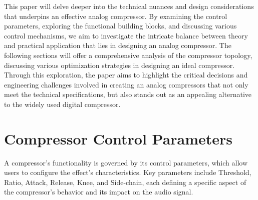 \documentclass[10pt]{article}
\begin{document}
\begin{multicols*}{2}
            This paper will delve deeper into the technical nuances and design considerations that underpins an effective analog compressor. By examining the control parameters, exploring the functional building blocks, and discussing various control mechanisms, we aim to investigate the intricate balance between theory and practical application that lies in designing an analog compressor. The following sections will offer a comprehensive analysis of the compressor topology, discussing various optimization strategies in designing an ideal compressor. Through this exploration, the paper aims to highlight the critical decisions and engineering challenges involved in creating an analog compressors that not only meet the technical specifications, but also stands out as an appealing alternative to the widely used digital compressor.

        \section{Compressor Control Parameters}
            A compressor's functionality is governed by its control parameters, which allow users to configure the effect's characteristics. Key parameters include Threshold, Ratio, Attack, Release, Knee, and Side-chain, each defining a specific aspect of the compressor's behavior and its impact on the audio signal.

            \noindent
            \begin{minipage}{\linewidth}
                \centering
\end{minipage}
\end{multicols*}
\end{document}
